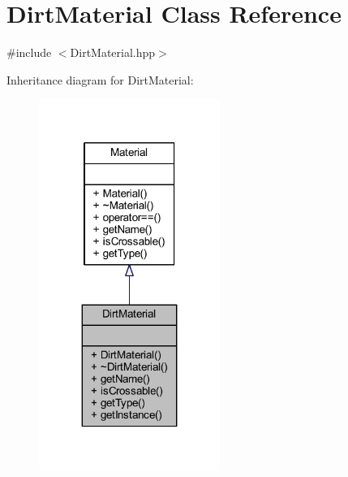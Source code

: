 \hypertarget{class_dirt_material}{}\section{Dirt\+Material Class Reference}
\label{class_dirt_material}


{\ttfamily \#include $<$Dirt\+Material.\+hpp$>$}



Inheritance diagram for Dirt\+Material\+:\nopagebreak
\begin{figure}[H]
\begin{center}
\leavevmode
\includegraphics[width=167pt]{class_dirt_material__inherit__graph}
\end{center}
\end{figure}


